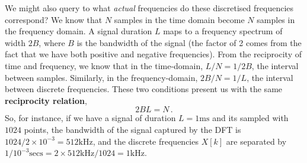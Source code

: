 We might also query to what \textit{actual} frequencies do these discretised
frequencies correspond? We know that $N$ samples in the time domain become
$N$ samples in the frequency domain. A signal duration $L$ maps to a frequency
spectrum of width $2B$, where $B$ is the bandwidth of the signal (the factor
of 2 comes from the fact that we have both positive and negative frequencies).
From the reciprocity of time and frequency, we know that in the time-domain,
$L/N = 1/2B$, the interval between samples. Similarly, in the frequency-domain,
$2B/N = 1/L$, the interval between discrete frequencies. These two conditions
present us with the same \textbf{reciprocity relation},
%
\begin{displaymath}
  2BL = N \,.
\end{displaymath}
%
So, for instance, if we have a signal of duration $L=1\mathrm{ms}$ and its
sampled with $1024$ points, the bandwidth of the signal captured by the
DFT is $1024 / 2\times 10^{-3} = 512\mathrm{kHz}$, and the discrete frequencies
$X[k]$ are separated by
$1/10^{-3}\mathrm{secs} = 2\times 512\mathrm{kHz} / 1024 = 1\mathrm{kHz}$.

